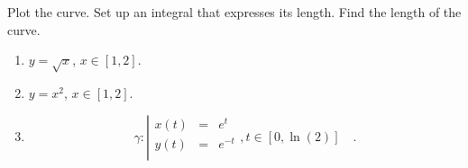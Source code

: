 Plot the curve. Set up an integral that expresses its length. Find the length of the curve. 
\begin{enumerate}
\item $y=\sqrt{x}$, $x\in [1, 2]$.
\item $y=x^2$, $x\in [1, 2]$.
\item 
\begin{equation*}
\gamma:\left| 
\begin{array}{rcl}
x(t)&=&e^t\\
y(t)&=&e^{-t}\\
\end{array}\right., t\in [0,\ln(2)]\quad .
\end{equation*}
\end{enumerate}
